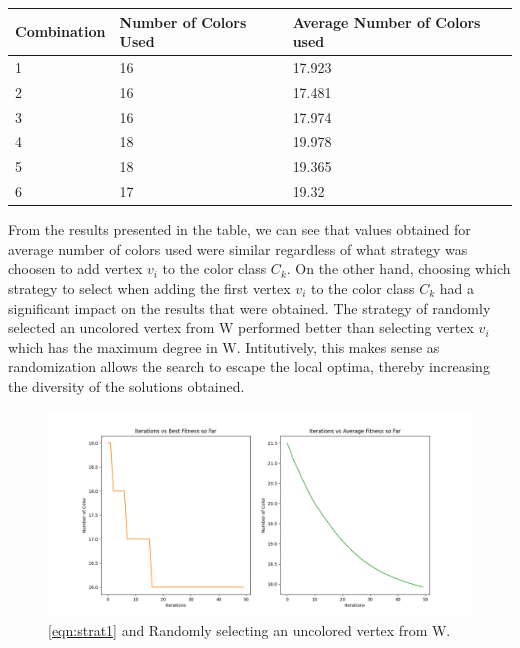 \documentclass[a4paper]{article}
\begin{document}
\begin{center}
    \begin{tabular}{|l|l|l|}
    \hline
    Combination & Number of Colors Used & Average   Number of Colors used \\ \hline
    1           & 16                    & 17.923                          \\ \hline
    2           & 16                    & 17.481                          \\ \hline
    3           & 16                    & 17.974                          \\ \hline
    4           & 18                    & 19.978                          \\ \hline
    5           & 18                    & 19.365                          \\ \hline
    6           & 17                    & 19.32                           \\ \hline
    \end{tabular}
\end{center}

From the results presented in the table, we can see that values obtained for average number of colors used were similar regardless of what strategy was choosen to add vertex $v_i$ to the color class $C_k$. On the other hand, choosing which strategy to select
when adding the first vertex $v_i$ to the color class $C_k$ had a significant impact on the results that were obtained. The strategy of randomly selected an uncolored vertex from W performed better than selecting vertex $v_i$ which has the maximum degree in W.
Intitutively, this makes sense as randomization allows the search to escape the local optima, thereby increasing the diversity of the solutions obtained.





\begin{center}
\begin{figure}[h]
\centering
\includegraphics[width=12cm]{Figures/fig1.png}
\caption{\ref{eqn:strat1} and Randomly selecting an uncolored vertex from W.}
\label{fig:figure1}
\end{figure}
\end{center}
\end{document}
